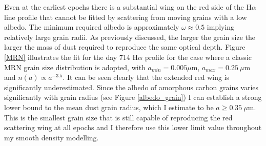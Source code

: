 Even at the earliest epochs there is a substantial wing on the red side of 
the H$\alpha$ line profile that cannot be fitted by scattering from moving 
grains with a low albedo.  The minimum required albedo is approximately 
$\omega \approx 0.5$ implying relatively large grain radii.  As previously 
discussed, the larger the grain size the larger the mass of dust required 
to reproduce the same optical depth.  Figure \ref{MRN} illustrates the fit 
for the day 714 H$\alpha$ profile for the case where a classic MRN 
\citep{Mathis1977} grain size distribution is adopted, with $a_{min}=0.005 
\mu$m, $a_{max}=0.25~\mu$m and $n(a) \propto a^{-3.5}$.  It can be seen 
clearly that the extended red wing is significantly underestimated.  
Since the albedo of amorphous carbon grains varies significantly with 
grain radius (see Figure \ref{albedo_grain}) I can establish a strong 
lower bound to the mean dust grain radius, which I estimate to be $a \ge 
0.35~\mu$m.  This is the smallest grain size that is still capable of 
reproducing the red scattering wing at all epochs and I therefore use 
this lower limit value throughout my smooth density modelling.


